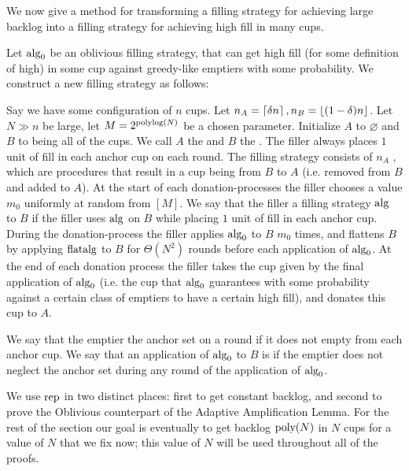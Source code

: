 We now give a method for transforming a filling strategy for
achieving large backlog into a filling strategy for achieving
high fill in many cups.
\begin{definition}
  \label{def:TO_rep}
  {\normalfont
  Let $\operatorname{\text{\textup{alg}}}_0$ be an oblivious filling strategy, that can get
  high fill (for some definition of high) in some cup against
  greedy-like emptiers with some probability. We construct a new
  filling strategy  as follows:

  Say we have some configuration of $n$ cups.
  Let $n_A = \left\lceil \delta n \right\rceil, n_B = \left\lfloor (1-\delta)n \right\rfloor$. Let $N
  \gg n$ be large, let $M=2^{\operatorname{\text{polylog}}(N)}$ be a chosen parameter. 
  Initialize $A$ to $\varnothing$ and $B$ to
  being all of the cups. We call $A$ the  and
  $B$ the . The filler always places $1$
  unit of fill in each anchor cup on each round. The filling
  strategy consists of $n_A$ , which are
  procedures that result in a cup being  from $B$
  to $A$ (i.e. removed from $B$ and added to $A$). At the start
  of each donation-processes the filler chooses a value $m_0$
  uniformly at random from $[M]$. We say that the filler
   a filling strategy $\operatorname{\text{\textup{alg}}}$ to $B$ if the
  filler uses $\operatorname{\text{\textup{alg}}}$ on $B$ while placing $1$ unit of fill
  in each anchor cup. During the donation-process the filler
  applies $\operatorname{\text{\textup{alg}}}_0$ to $B$ $m_0$ times, and flattens $B$ by
  applying $\operatorname{\text{\textup{flatalg}}}$ to $B$ for $\Theta(N^2)$ rounds before each
  application of $\operatorname{\text{\textup{alg}}}_0$. At the end of each donation process
  the filler takes the cup given by the final application of
  $\operatorname{\text{\textup{alg}}}_0$ (i.e. the cup that $\operatorname{\text{\textup{alg}}}_0$ guarantees with some
  probability against a certain class of emptiers to have a
  certain high fill), and donates this cup to $A$. 

We say that the emptier  the anchor set on a round
if it does not empty from each anchor cup. We say that an
application of $\operatorname{\text{\textup{alg}}}_0$ to $B$ is  if
the emptier does not neglect the anchor set during any round of
the application of $\operatorname{\text{\textup{alg}}}_0$.
}

\end{definition}

We use $\operatorname{\text{\textup{rep}}}$ in two distinct places: first to get constant
backlog, and second to prove the Oblivious counterpart of the
Adaptive Amplification Lemma.
For the rest of the section our goal is eventually to get backlog
$\operatorname{\text{poly}}(N)$ in $N$ cups for a value of $N$ that we fix now; this
value of $N$ will be used throughout all of the proofs.

